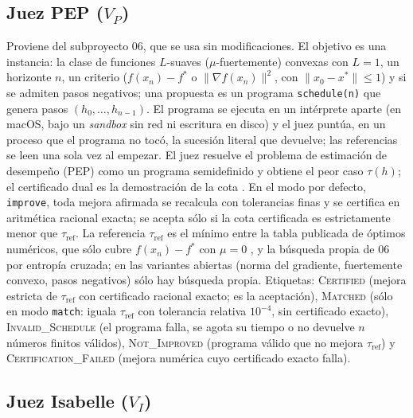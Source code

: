 \documentclass[11pt,a4paper]{article}
\begin{document}
\subsection{Juez PEP ($V_P$)}

Proviene del subproyecto 06, que se usa sin modificaciones. El objetivo es una instancia: la clase de funciones $L$-suaves ($\mu$-fuertemente) convexas con $L = 1$, un horizonte $n$, un criterio ($f(x_n) - f^*$ o $\|\nabla f(x_n)\|^2$, con $\|x_0 - x^*\| \le 1$) y si se admiten pasos negativos; una propuesta es un programa \texttt{schedule(n)} que genera pasos $(h_0,\dots,h_{n-1})$. El programa se ejecuta en un intérprete aparte (en macOS, bajo un \emph{sandbox} sin red ni escritura en disco) y el juez puntúa, en un proceso que el programa no tocó, la sucesión literal que devuelve; las referencias se leen una sola vez al empezar. El juez resuelve el problema de estimación de desempeño (PEP) como un programa semidefinido y obtiene el peor caso $\tau(h)$; el certificado dual es la demostración de la cota \citep{DroriTeboulle2014,TaylorHendrickxGlineur2017}. En el modo por defecto, \texttt{improve}, toda mejora afirmada se recalcula con tolerancias finas y se certifica en aritmética racional exacta; se acepta sólo si la cota certificada es estrictamente menor que $\tau_{\mathrm{ref}}$. La referencia $\tau_{\mathrm{ref}}$ es el mínimo entre la tabla publicada de óptimos numéricos, que sólo cubre $f(x_n) - f^*$ con $\mu = 0$ \citep{DasGuptaVanParysRyu2024,GrimmerShuWang2024}, y la búsqueda propia de 06 por entropía cruzada; en las variantes abiertas (norma del gradiente, fuertemente convexo, pasos negativos) sólo hay búsqueda propia. Etiquetas: \textsc{Certified} (mejora estricta de $\tau_{\mathrm{ref}}$ con certificado racional exacto; es la aceptación), \textsc{Matched} (sólo en modo \texttt{match}: iguala $\tau_{\mathrm{ref}}$ con tolerancia relativa $10^{-4}$, sin certificado exacto), \textsc{Invalid\_Schedule} (el programa falla, se agota su tiempo o no devuelve $n$ números finitos válidos), \textsc{Not\_Improved} (programa válido que no mejora $\tau_{\mathrm{ref}}$) y \textsc{Certification\_Failed} (mejora numérica cuyo certificado exacto falla).

\subsection{Juez Isabelle ($V_I$)}
\end{document}
